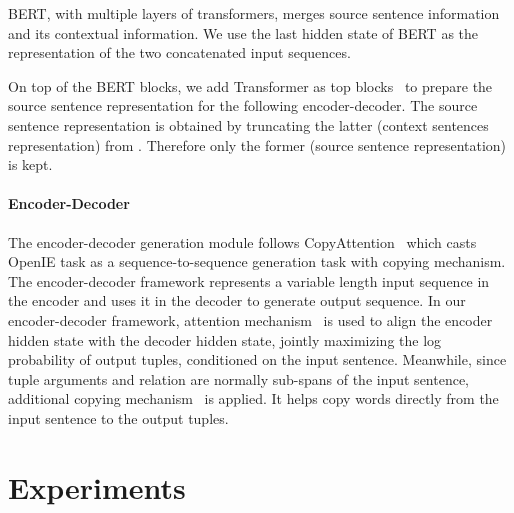 \documentclass[11pt,a4paper]{article}
\begin{document}
BERT, with multiple layers of transformers, merges source sentence information and its contextual information. We use the last hidden state  of BERT as the representation of the two concatenated input sequences.

On top of the BERT blocks, we add Transformer as top blocks~\cite{vaswani2017attention} to prepare the source sentence representation for the following encoder-decoder.
The source sentence representation is obtained by truncating the latter (context sentences representation)  from . Therefore only the former (source sentence representation)  is kept.


\paragraph{Encoder-Decoder}
The encoder-decoder generation module follows CopyAttention~\cite{cui2018neural} which casts OpenIE task as a sequence-to-sequence generation task with copying mechanism. The encoder-decoder framework represents a variable length input sequence in the encoder and uses it in the decoder to generate output sequence. In our encoder-decoder framework, attention mechanism~\cite{bahdanau2014neural} is used to align the encoder hidden state with the decoder hidden state, jointly maximizing the log probability of output tuples, conditioned on the input sentence. Meanwhile, since tuple arguments and relation are normally sub-spans of the input sentence, additional copying mechanism~\cite{gu2016incorporating} is applied. It helps copy words directly from the input sentence to the output tuples.

\section{Experiments}
\label{sec:exp}
\end{document}
